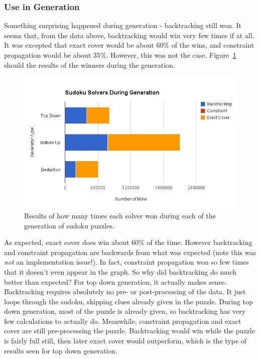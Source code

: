     \subsubsection{Use in Generation}
    Something surprising happened during generation - backtracking still won. It seems that, from the data above, backtracking would
    win very few times if at all. It was excepted that exact cover would be about $60\%$ of the wins, and constraint propagation would
    be about $35\%$. However, this was not the case. Figure~\ref{fig:solvergen} should the results of the winners during the generation.
    \begin{figure}[H]
        \centering
        \includegraphics[scale=0.70]{solvers.png}
        \caption{Results of how many times each solver won during each of the generation of sudoku puzzles.}
        \label{fig:solvergen}
    \end{figure}
    As expected, exact cover does win about $60\%$ of the time. However backtracking and constraint propagation are backwards from what was expected
    (note this was \textit{not} an implementation issue!). In fact, constraint propagation won so few times that it doesn't even appear in the graph.
    So why did backtracking do much better than expected? For top down generation, it actually makes sense. Backtracking requires absolutely
    no pre- or post-processing of the data. It just loops through the sudoku, skipping clues already given in the puzzle. During top down generation,
    most of the puzzle is already given, so backtracking has very few calculations to actually do. Meanwhile, constraint propagation and exact
    cover are still pre-processing the puzzle. Backtracking would win while the puzzle is fairly full still, then later exact cover would outperform,
    which is the type of results seen for top down generation.\\
